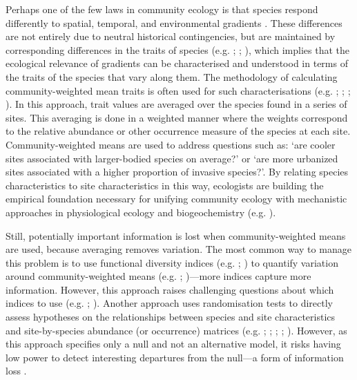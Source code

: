 \documentclass[12pt]{ecology}
\begin{document}
Perhaps one of the few laws in community ecology is that species respond differently to spatial, temporal, and environmental gradients \citep{Gleason1917,Whittaker1967}.  These differences are not entirely due to neutral historical contingencies, but are maintained by corresponding differences in the traits of species (e.g. ; ; ), which implies that the ecological relevance of gradients can be characterised and understood in terms of the traits of the species that vary along them.  The methodology of calculating community-weighted mean traits is often used for such characterisations (e.g. ; ; ; ).  In this approach, trait values are averaged over the species found in a series of sites.  This averaging is done in a weighted manner where the weights correspond to the relative abundance or other occurrence measure of the species at each site.  Community-weighted means are used to address questions such as:  `are cooler sites associated with larger-bodied species on average?' or `are more urbanized sites associated with a higher proportion of invasive species?'.  By relating species characteristics to site characteristics in this way, ecologists are building the empirical foundation necessary for unifying community ecology with mechanistic approaches in physiological ecology and biogeochemistry (e.g. ).

Still, potentially important information is lost when community-weighted means are used, because averaging removes variation.  The most common way to manage this problem is to use functional diversity indices (e.g. ; ) to quantify variation around community-weighted means (e.g. ; )---more indices capture more information.  However, this approach raises challenging questions about which indices to use (e.g. ; ).  Another approach uses randomisation tests to directly assess hypotheses on the relationships between species and site characteristics and site-by-species abundance (or occurrence) matrices (e.g. ; ; ; ; ).  However, as this approach specifies only a null and not an alternative model, it risks having low power to detect interesting departures from the null---a form of information loss \citep{IvesAndHelmus2011}.
\end{document}
